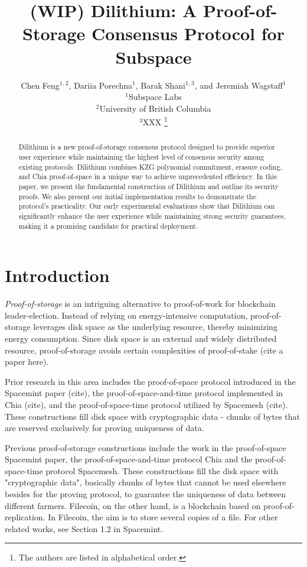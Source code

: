 \documentclass[12pt, onecolumn]{IEEEtran}
\title{(WIP) Dilithium: A Proof-of-Storage Consensus Protocol for Subspace}
\author{Chen Feng$^{1,}$$^{ 2}$, Dariia Porechna$^{1}$, Barak Shani$^{1,}$$^{ 3}$, and Jeremiah Wagstaff$^{1}$\\
$^1$Subspace Labs\\
$^2$University of British Columbia\\
$^3$XXX
\thanks{The authors are listed in alphabetical order.}}
\begin{document}
\maketitle

\begin{abstract}
    Dilithium is a new proof-of-storage consensus protocol designed to provide superior
    user experience while maintaining the highest level 
    of consensus security among existing protocols.
    Dilithium combines KZG polynomial commitment, erasure coding, and Chia proof-of-space
    in a unique way to achieve unprecedented efficiency. 
    In this paper, we present the fundamental construction of Dilithium
    and outline its security proofs. We also present our initial implementation results to demonstrate the protocol's practicality.
    Our early experimental evaluations show that Dilithium can significantly enhance the user experience while maintaining strong security guarantees, making it a promising candidate for practical deployment.
\end{abstract}

\section{Introduction}

\textit{Proof-of-storage} is an intriguing alternative to proof-of-work for blockchain leader-election. 
Instead of relying on energy-intensive computation, proof-of-storage leverages disk space as the underlying resource, 
thereby minimizing energy consumption. Since disk space is an external and widely distributed resource, 
proof-of-storage avoids certain complexities of proof-of-stake (cite a paper here).

Prior research in this area includes the proof-of-space protocol introduced in the Spacemint paper (cite), the proof-of-space-and-time protocol 
implemented in Chia (cite), and the proof-of-space-time protocol utilized by Spacemesh (cite).
These constructions fill disk space with cryptographic data - chunks of bytes that are 
reserved exclusively for proving uniqueness of data. 

Previous proof-of-storage constructions include the work in the proof-of-space Spacemint paper, the proof-of-space-and-time protocol Chia and the proof-of-space-time protocol Spacemesh. These constructions fill the disk space with "cryptographic data", basically chunks of bytes that cannot be used elsewhere besides for the proving protocol, to guarantee the uniqueness of data between different farmers. Filecoin, on the other hand, is a blockchain based on proof-of-replication. In Filecoin, the aim is to store several copies of a file. For other related works, see Section 1.2 in Spacemint.
\end{document}
